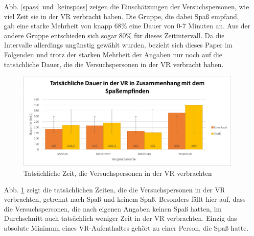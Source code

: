 \documentclass{Paper}
\begin{document}
Abb. \ref{spass} und \ref{keinspass} zeigen die Einschätzungen der Versuchspersonen, wie viel Zeit sie in der VR verbracht haben. Die Gruppe, die dabei Spaß empfand, gab eine starke Mehrheit von knapp 68\% eine Dauer von 0-7 Minuten an. Aus der andere Gruppe entschieden sich sogar 80\% für dieses Zeitintervall. Da die Intervalle allerdings ungünstig gewählt wurden, bezieht sich dieses Paper im Folgenden und trotz der starken Mehrheit der Angaben nur noch auf die tatsächliche Dauer, die die Versuchspersonen in der VR verbracht haben.
\clearpage

      
     \begin{figure}[H]
	\includegraphics[scale=0.7]{../Diagramme/spass/spassDauer.png}
  \caption{Tatsächliche Zeit, die Versuchspersonen in der VR verbrachten}
  \label{ZeitKeinSpass}
        \end{figure}
        
        Abb. \ref{ZeitKeinSpass} zeigt die tatsächlichen Zeiten, die die Versuchspersonen in der VR verbrachten, getrennt nach Spaß und keinem Spaß. Besonders fällt hier auf, dass die Versuchspersonen, die nach eigenen Angaben keinen Spaß hatten, im Durchschnitt auch tatsächlich weniger Zeit in der VR verbrachten. Einzig das absolute Minimum eines VR-Aufenthaltes gehört zu einer Person, die Spaß hatte. 
\end{document}
